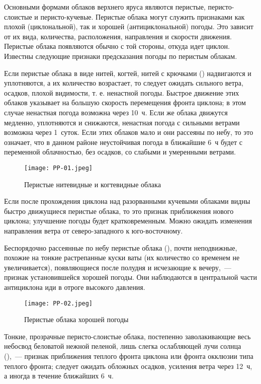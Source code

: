 Основными формами облаков верхнего яруса являются перистые,
перисто-слоистые и перисто-кучевые. Перистые облака могут служить
признаками как плохой (циклональной), так и хорошей (антициклональной)
погоды. Это зависит от их вида, количества, расположения, направления
и скорости движения. Перистые облака появляются обычно с той стороны,
откуда идет циклон. Известны следующие признаки предсказания погоды по
перистым облакам.

 Если перистые облака в виде нитей, когтей, нитей с крючками
() надвигаются и уплотняются, а их количество возрастает,
то следует ожидать сильного ветра, осадков, плохой видимости,
т. е. ненастной погоды. Быстрое движение этих облаков указывает на
большую скорость перемещения фронта циклона; в этом случае ненастная
погода возможна через 10~ч. Если же облака движутся медленно,
уплотняются и снижаются, ненастная погода с сильными ветрами возможна
через 1~суток. Если этих облаков мало и они рассеяны по небу,
то это означает, что в данном районе неустойчивая погода в ближайшие
6~ч будет с переменной облачностью, без осадков, со слабыми и
умеренными ветрами.

\begin{figure}[htb]
  \centering{}
  \texttt{[image: PP-01.jpeg]}
  \caption{Перистые нитевидные и когтевидные облака}
  \label{fig:pp01}
  \small
  \centering{}
\end{figure}

 Если после прохождения циклона над разорванными кучевыми
облаками видны быстро движущиеся перистые облака, то это признак
приближения нового циклона; улучшение погоды будет
кратковременным. Можно ожидать изменения направления ветра от
северо-западного к юго-восточному.

 Беспорядочно рассеянные по небу перистые облака (),
почти неподвижные, похожие на тонкие растрепанные куски ваты (их
количество со временем не увеличивается), появляющиеся после полудня и
исчезающие к вечеру,~--- признак установившейся хорошей погоды. Они
наблюдаются в центральной части антициклона иди в отроге высокого
давления.

\begin{figure}[htb]
  \centering{}
  \texttt{[image: PP-02.jpeg]}
  \caption{Перистые облака хорошей погоды}
  \label{fig:pp02}
  \small
  \centering{}
\end{figure}

 Тонкие, прозрачные перисто-слоистые облака, постепенно
заволакивающие весь небосвод беловатой нежной пеленой, лишь слегка
ослабляющей лучи солнца (),~--- признак приближения теплого
фронта циклона или фронта окклюзии типа теплого фронта; следует
ожидать обложных осадков, усиления ветра через 12~ч, а иногда
в течение ближайших 6~ч.

